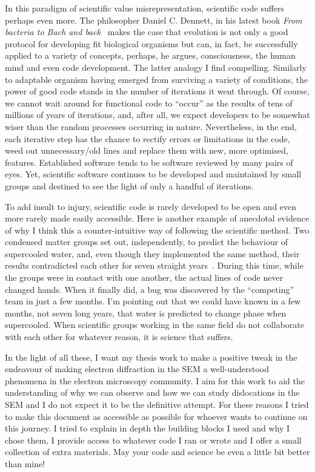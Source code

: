 In this paradigm of scientific value misrepresentation, scientific code suffers perhaps even more. The philosopher Daniel C. Dennett, in his latest book \textit{From bacteria to Bach and back}~\cite{Dennett} makes the case that evolution is not only a good protocol for developing fit biological organisms but can, in fact, be successfully applied to a variety of concepts, perhaps, he argues, consciousness, the human mind and even code development. The latter analogy I find compelling. Similarly to adaptable organism having emerged from surviving a variety of conditions, the power of good code stands in the number of iterations it went through. Of course, we cannot wait around for functional code to ``occur'' as the results of tens of millions of years of iterations, and, after all, we expect developers to be somewhat wiser than the random processes occurring in nature. Nevertheless, in the end, each iterative step has the chance to rectify errors or limitations in the code, weed out unnecessary/old lines and replace them with new, more optimised, features. Established software tends to be software reviewed by many pairs of eyes. Yet, scientific software continues to be developed and  maintained by small groups and destined to see the light of only a handful of iterations.  


To add insult to injury, scientific code is rarely developed to be open and even more rarely made easily accessible. Here is another example of anecdotal evidence of why I think this a counter-intuitive way of following the scientific method. Two condensed matter groups set out, independently, to predict the behaviour of supercooled water, and, even though they implemented the same method, their results contradicted each other for seven straight years~\cite{supercool}. During this time, while the groups were in contact with one another, the actual lines of code never changed hands. When it finally did, a bug was discovered by the ``competing'' team in just a few months. I'm pointing out that we could have known in a few months, not seven long years, that water is predicted to change phase when supercooled. When scientific groups working in the same field do not collaborate with each other for whatever reason, it is science that suffers.


In the light of all these, I want my thesis work to make a positive tweak in the endeavour of making electron diffraction in the SEM a well-understood phenomena in the electron microscopy community. I aim for this work to aid the understanding of why we can observe and how we can study dislocations in the SEM and I do not expect it to be the definitive attempt. For these reasons I tried to make this document as accessible as possible for whoever wants to continue on this journey. I tried to explain in depth the building blocks I used and why I chose them, I provide access to whatever code I ran or wrote and I offer a small collection of extra materials. May your code and science be even a little bit better than mine!



